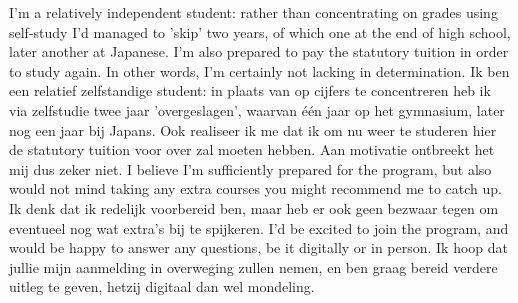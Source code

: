 \documentclass[11pt, a4paper]{awesome-cv}
\newcommand{\langen}[1]{\ifen#1\fi}
\newcommand{\langnl}[1]{\ifnl#1\fi}
\begin{document}
\begin{cvletter}
    \langen{I'm a relatively independent student:
    rather than concentrating on grades using self-study I'd managed to 'skip' two years,
    of which one at the end of high school, later another at Japanese.
    I'm also prepared to pay the statutory tuition in order to study again.
    In other words,
    I'm certainly not lacking in determination.
    }\langnl{Ik ben een relatief zelfstandige student:
    in plaats van op cijfers te concentreren heb ik via zelfstudie twee jaar 'overgeslagen',
    waarvan één jaar op het gymnasium, later nog een jaar bij Japans.
    Ook realiseer ik me dat ik om nu weer te studeren hier de statutory tuition voor over zal moeten hebben.
    Aan motivatie ontbreekt het mij dus zeker niet.
    }
    \newline\newline
    \langen{I believe I'm sufficiently prepared for the program, but also would not mind taking any extra courses you might recommend me to catch up.
    }\langnl{Ik denk dat ik redelijk voorbereid ben, maar heb er ook geen bezwaar tegen om eventueel nog wat extra's bij te spijkeren.
    }
    \newline\newline
    \langen{I'd be excited to join the program,
    and would be happy to answer any questions, be it digitally or in person.
    }\langnl{Ik hoop dat jullie mijn aanmelding in overweging zullen nemen,
    en ben graag bereid verdere uitleg te geven, hetzij digitaal dan wel mondeling.
    }
    
    \end{cvletter}
    \makeletterclosing
    
\end{document}
